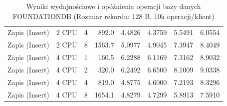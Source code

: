 \begin{table}[ht]
{\begin{tabular}{llcrrrrr}
Zapis (Insert) & 2 CPU & 4 & 892.0 & 4.4826 & 4.3759 & 5.5491 & 6.0554 \\
Zapis (Insert) & 2 CPU & 8 & 1563.7 & 5.0977 & 4.9045 & 7.3947 & 8.4049 \\
Zapis (Insert) & 4 CPU & 1 & 160.5 & 6.2288 & 6.1169 & 7.3162 & 8.9032 \\
Zapis (Insert) & 4 CPU & 2 & 320.0 & 6.2492 & 6.6500 & 8.1009 & 9.0338 \\
Zapis (Insert) & 4 CPU & 4 & 819.0 & 4.8775 & 4.6000 & 7.2193 & 8.3296 \\
Zapis (Insert) & 4 CPU & 8 & 1654.1 & 4.8279 & 4.7299 & 5.8913 & 7.5910 \\
\bottomrule
\end{tabular}%
}
\caption{Wyniki wydajnościowe i opóźnienia operacji bazy danych FOUNDATIONDB (Rozmiar rekordu: 128 B, 10k operacji/klient)}
\label{tab:latency_foundationdb_small_10000}
\end{table}
